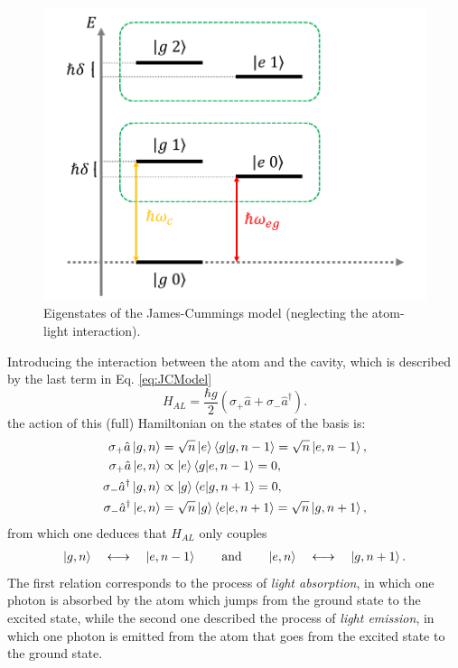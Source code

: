 \begin{figure}[h]
\centering
    \includegraphics[width=0.57\linewidth]{images/eigenstatesAL.png}
    \caption{Eigenstates of the James-Cummings model (neglecting the atom-light interaction).}
    \label{fig:JCeigen}
\end{figure}

Introducing the interaction between the atom and the cavity, which is described by the last term in Eq. \ref{eq:JCModel}
\begin{equation*}
    H_{AL} = \frac{\hbar g}{2} ({\sigma_{+} \hat{a}} + {\sigma_{-} \hat{a}^{\dagger}}). 
\end{equation*}
the action of this (full) Hamiltonian on the states of the basis is: 
\begin{align*}
    \sigma_+ \hat{a} \ket{g,n} & = \sqrt{n} \ket{e}\bra{g} \ket{g,n-1} = \sqrt{n} \ket{e,n-1}, \\
    \sigma_+ \hat{a} \ket{e,n} & \propto \ket{e}\bra{g} \ket{e,n-1} = 0, \\
    \sigma_- \hat{a}^\dagger \ket{g,n} & \propto \ket{g}\bra{e} \ket{g,n+1} = 0, \\
    \sigma_- \hat{a}^\dagger \ket{e,n} & = \sqrt{n} \ket{g}\bra{e} \ket{e,n+1} = \sqrt{n} \ket{g,n+1}, 
\end{align*}
from which one deduces that $H_{AL}$ only couples 
\begin{align*}
    \ket{g, n} \quad \longleftrightarrow \quad \ket{e,n-1} \qquad \text{and} \qquad 
    \ket{e, n} \quad \longleftrightarrow \quad \ket{g,n+1}. 
\end{align*}
The first relation corresponds to the process of \textit{light absorption}, in which one photon is absorbed by the atom which jumps from the ground state to the excited state, while the second one described the process of \textit{light emission}, in which one photon is emitted from the atom that goes from the excited state to the ground state.

